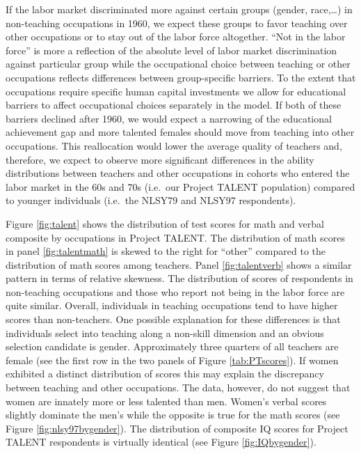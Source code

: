 \documentclass[onehalfspacing,11pt]{article}
\begin{document}
If the labor market discriminated more against certain groups (gender, race,\ldots) in non-teaching occupations in 1960, we expect these groups to favor teaching over other occupations or to stay out of the labor force altogether. ``Not in the labor force'' is more a reflection of the absolute level of labor market discrimination against particular group while the occupational choice between teaching or other occupations reflects differences between group-specific barriers. To the extent that occupations require specific human capital investments we allow for educational barriers to affect occupational choices separately in the model. If both of these barriers declined after 1960, we would expect a narrowing of the educational achievement gap and more talented females should move from teaching into other occupations. This reallocation would lower the average quality of teachers and, therefore, we expect to observe more significant differences in the ability distributions between teachers and other occupations in cohorts who entered the labor market in the 60s and 70s (i.e.~our Project TALENT population) compared to younger individuals (i.e.~the NLSY79 and NLSY97 respondents). 
	
Figure \ref{fig:talent} shows the distribution of test scores for math and verbal composite by occupations in Project TALENT. The distribution of math scores in panel \ref{fig:talentmath} is skewed to the right for ``other'' compared to the distribution of math scores among teachers. Panel \ref{fig:talentverb} shows a similar pattern in terms of relative skewness. The distribution of scores of respondents in non-teaching occupations and those who report not being in the labor force are quite similar. Overall, individuals in teaching occupations tend to have higher scores than non-teachers. One possible explanation for these differences is that individuals select into teaching along a non-skill dimension and an obvious selection candidate is gender. Approximately three quarters of all teachers are female (see the first row in the two panels of Figure \ref{tab:PTscores}). If women exhibited a distinct distribution of scores this may explain the discrepancy between teaching and other occupations. The data, however, do not suggest that women are innately more or less talented than men. Women's verbal scores slightly dominate the men's while the opposite is true for the math scores (see Figure \ref{fig:nlsy97bygender}). The distribution of composite IQ scores for Project TALENT respondents is virtually identical (see Figure \ref{fig:IQbygender}). 
\end{document}
